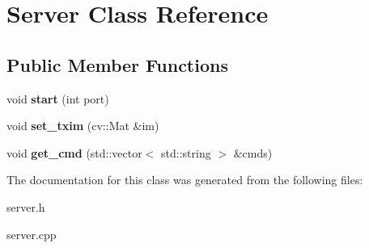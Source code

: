 \hypertarget{class_server}{}\section{Server Class Reference}
\label{class_server}
\subsection*{Public Member Functions}
\begin{DoxyCompactItemize}
\item 
\hypertarget{class_server_a7ebba75484fe844bb3e2920205455a74}{}\label{class_server_a7ebba75484fe844bb3e2920205455a74} 
void {\bfseries start} (int port)
\item 
\hypertarget{class_server_ad49615121ae4496bb6f8248530937101}{}\label{class_server_ad49615121ae4496bb6f8248530937101} 
void {\bfseries set\+\_\+txim} (cv\+::\+Mat \&im)
\item 
\hypertarget{class_server_ad01a77ea78115b7e6fc0603e0f239963}{}\label{class_server_ad01a77ea78115b7e6fc0603e0f239963} 
void {\bfseries get\+\_\+cmd} (std\+::vector$<$ std\+::string $>$ \&cmds)
\end{DoxyCompactItemize}


The documentation for this class was generated from the following files\+:\begin{DoxyCompactItemize}
\item 
server.\+h\item 
server.\+cpp\end{DoxyCompactItemize}

